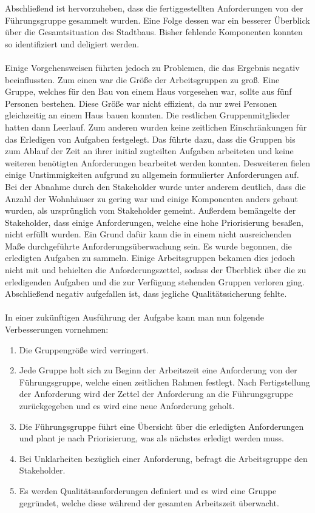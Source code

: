 \documentclass{article}
\begin{document}
Abschließend ist hervorzuheben, dass die fertiggestellten Anforderungen von der Führungsgruppe gesammelt wurden.
Eine Folge dessen war ein besserer Überblick über die Gesamtsituation des Stadtbaus.
Bisher fehlende Komponenten konnten so identifiziert und deligiert werden.\\
\\
Einige Vorgehensweisen führten jedoch zu Problemen, die das Ergebnis negativ beeinflussten.
Zum einen war die Größe der Arbeitsgruppen zu groß.
Eine Gruppe, welches für den Bau von einem Haus vorgesehen war, sollte aus fünf Personen bestehen.
Diese Größe war nicht effizient, da nur zwei Personen gleichzeitig an einem Haus bauen konnten.
Die restlichen Gruppenmitglieder hatten dann Leerlauf.
Zum anderen wurden keine zeitlichen Einschränkungen für das Erledigen von Aufgaben festgelegt.
Das führte dazu, dass die Gruppen bis zum Ablauf der Zeit an ihrer initial zugteilten Aufgaben arbeiteten und keine weiteren benötigten Anforderungen bearbeitet werden konnten.
Desweiteren fielen einige Unstimmigkeiten aufgrund zu allgemein formulierter Anforderungen auf.
Bei der Abnahme durch den Stakeholder wurde unter anderem deutlich, dass die Anzahl der Wohnhäuser zu gering war und einige Komponenten anders gebaut wurden, als ursprünglich vom Stakeholder gemeint.
Außerdem bemängelte der Stakeholder, dass einige Anforderungen, welche eine hohe Priorisierung besaßen, nicht erfüllt wurden.
Ein Grund dafür kann die in einem nicht ausreichenden Maße durchgeführte Anforderungsüberwachung sein.
Es wurde begonnen, die erledigten Aufgaben zu sammeln.
Einige Arbeitsgruppen bekamen dies jedoch nicht mit und behielten die Anforderungszettel, sodass der Überblick über die zu erledigenden Aufgaben und die zur Verfügung stehenden Gruppen verloren ging.
Abschließend negativ aufgefallen ist, dass jegliche Qualitätssicherung fehlte.\\
\\
In einer zukünftigen Ausführung der Aufgabe kann man nun folgende Verbesserungen vornehmen:
\begin{enumerate}
	\item Die Gruppengröße wird verringert.
	\item Jede Gruppe holt sich zu Beginn der Arbeitszeit eine Anforderung von der Führungsgruppe, welche einen zeitlichen Rahmen festlegt.
	      Nach Fertigstellung der Anforderung wird der Zettel der Anforderung an die Führungsgruppe zurückgegeben und es wird eine neue Anforderung geholt.
	\item Die Führungsgruppe führt eine Übersicht über die erledigten Anforderungen und plant je nach Priorisierung, was als nächstes erledigt werden muss.
	\item Bei Unklarheiten bezüglich einer Anforderung, befragt die Arbeitsgruppe den Stakeholder.
	\item Es werden Qualitätsanforderungen definiert und es wird eine Gruppe gegründet, welche diese während der gesamten Arbeitszeit überwacht.
\end{enumerate}
\end{document}
